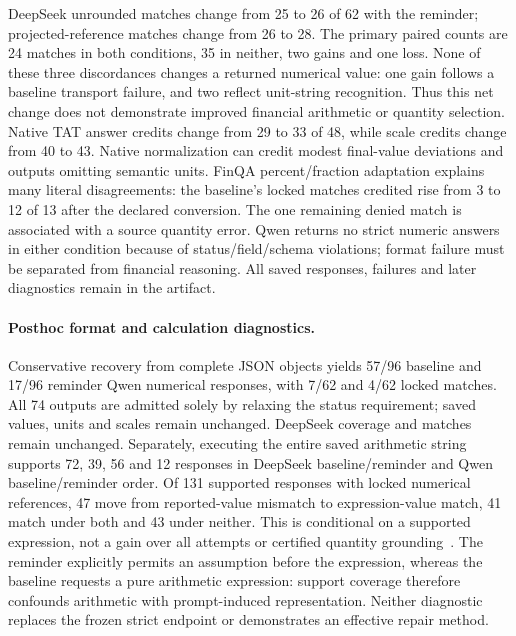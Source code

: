 DeepSeek unrounded matches change from 25 to 26 of 62 with the reminder; projected-reference matches change from 26 to 28. The primary paired counts are 24 matches in both conditions, 35 in neither, two gains and one loss. None of these three discordances changes a returned numerical value: one gain follows a baseline transport failure, and two reflect unit-string recognition. Thus this net change does not demonstrate improved financial arithmetic or quantity selection. Native TAT answer credits change from 29 to 33 of 48, while scale credits change from 40 to 43. Native normalization can credit modest final-value deviations and outputs omitting semantic units. FinQA percent/fraction adaptation explains many literal disagreements: the baseline's locked matches credited rise from 3 to 12 of 13 after the declared conversion. The one remaining denied match is associated with a source quantity error. Qwen returns no strict numeric answers in either condition because of status/field/schema violations; format failure must be separated from financial reasoning. All saved responses, failures and later diagnostics remain in the artifact.

\paragraph{Posthoc format and calculation diagnostics.} Conservative recovery from complete JSON objects yields 57/96 baseline and 17/96 reminder Qwen numerical responses, with 7/62 and 4/62 locked matches. All 74 outputs are admitted solely by relaxing the status requirement; saved values, units and scales remain unchanged. DeepSeek coverage and matches remain unchanged. Separately, executing the entire saved arithmetic string supports 72, 39, 56 and 12 responses in DeepSeek baseline/reminder and Qwen baseline/reminder order. Of 131 supported responses with locked numerical references, 47 move from reported-value mismatch to expression-value match, 41 match under both and 43 under neither. This is conditional on a supported expression, not a gain over all attempts or certified quantity grounding~\cite{pot}. The reminder explicitly permits an assumption before the expression, whereas the baseline requests a pure arithmetic expression: support coverage therefore confounds arithmetic with prompt-induced representation. Neither diagnostic replaces the frozen strict endpoint or demonstrates an effective repair method.

